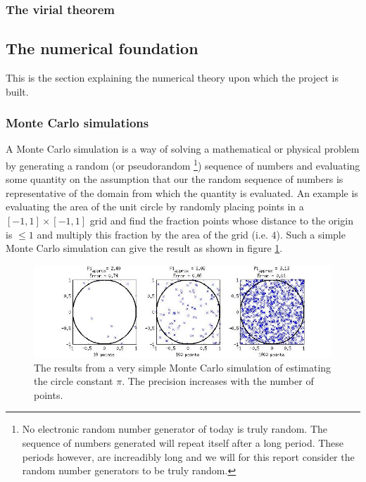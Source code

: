 \subsubsection{The virial theorem}


\subsection{The numerical foundation}
This is the section explaining the numerical theory upon which the project is built. 

\subsubsection{Monte Carlo simulations}
A Monte Carlo simulation is a way of solving a mathematical or physical problem by generating a random
(or pseudorandom
\footnote
{No electronic random number generator of today is truly random. 
The sequence of numbers generated will repeat itself after a long period. 
These periods however, are increadibly long and we will for this report 
consider the random number generators to be truly random.})
sequence of numbers and evaluating some quantity on the assumption that our the random sequence of numbers is representative of the domain from which the quantity is evaluated.
An example is evaluating the area of the unit circle by randomly placing points in a $[-1,1] \times [-1,1] $ grid and find the fraction points whose distance to the origin is $\leq 1$ and multiply this fraction by the area of the grid (i.e. $4$).
Such a simple Monte Carlo simulation can give the result as shown in figure \ref{fig:Monte_Carlo_Illustration}.

\begin{figure}[h!]
        \centering 
        \includegraphics[width=\textwidth]{Monte_Carlo_Illustration.jpg}
        \caption{The results from a very simple Monte Carlo simulation of 
        estimating the circle constant $\pi$. 
        The precision increases with the number of points.}
        \label{fig:Monte_Carlo_Illustration}
\end{figure}

